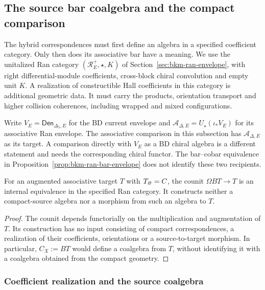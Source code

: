 \subsection{The source bar coalgebra and the compact comparison}
\label{subsec:koszul-source}

The hybrid correspondences must first define an algebra in a specified
coefficient category. Only then does its associative bar have a
meaning. We use the unitalized Ran category
$(\mathcal R_E^+,\star,K)$ of Section~\ref{sec:bkm-ran-envelope},
with right differential-module coefficients, cross-block chiral
convolution and empty unit $K$. A realization of constructible Hall
coefficients in this category is additional geometric data.
It must carry the products, orientation transport and higher collision
coherences, including wrapped and mixed configurations.

Write $V_E=\mathsf{Den}_{\Delta_5,E}$ for the BD current envelope
and $\mathcal A_{\Delta,E}=U_\star(\iota_*V_E)$ for its associative
Ran envelope. The associative comparison in this subsection has
$\mathcal A_{\Delta,E}$ as its target. A comparison directly with
$V_E$ as a BD chiral algebra is a different statement and needs the
corresponding chiral functor. The bar--cobar equivalence in
Proposition~\ref{prop:bkm-ran-bar-envelope} does not identify these
two recipients.

\begin{lemma}
\label{lem:source-target-koszul-separation}
For an augmented associative target $T$ with $T_\varnothing=C$,
the counit $\Omega BT\to T$ is an internal equivalence in the
specified Ran category. It constructs neither a compact-source
algebra nor a morphism from such an algebra to $T$.
\end{lemma}
\begin{proof}
The counit depends functorially on the multiplication and
augmentation of $T$. Its construction has no input consisting of
compact correspondences, a realization of their coefficients,
orientations or a source-to-target morphism. In particular,
$C_X:=BT$ would define a coalgebra from $T$, without identifying it
with a coalgebra obtained from the compact geometry.
\end{proof}

\subsubsection*{Coefficient realization and the source coalgebra}

